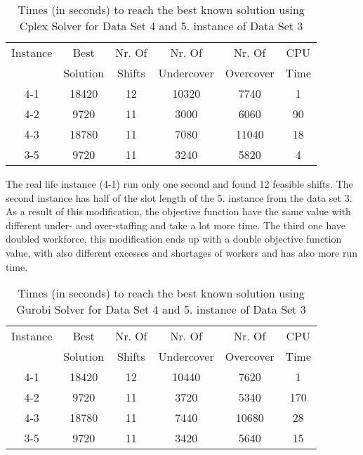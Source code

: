 \begin{table} \small
\centering
\begin{tabular}{cccccc}
\hline
 Instance & Best & Nr. Of & Nr. Of  & Nr. Of   & CPU   \\
 & Solution & Shifts & Undercover & Overcover & Time \\
\hline
4-1 &  18420	& 12 & 10320 & 7740 & 1 \\

4-2 &  9720	& 11 & 3000 & 6060 & 90 \\

4-3 &  18780 & 11 & 7080 & 11040 & 18   \\

3-5 &  9720	& 11 & 3240 & 5820 & 4     \\
\hline
\end{tabular}
\caption{Times (in seconds) to reach the best known solution using Cplex Solver for Data Set 4 and 5. instance of Data Set 3}
\label{tbl:dataset4}
\end{table}


The real life instance (4-1) run only one second and found 12 feasible shifts. The second instance has half of the slot length of the 5. instance from the data set 3. As a result of this modification, the objective function have the same value with different under- and over-staffing and take a lot more time. The third one have doubled workforce, this modification ends up with a double objective function value, with also different excesses and shortages of workers and has also more run time.

\begin{table} \small
\centering
\begin{tabular}{cccccc}
\hline
 Instance & Best & Nr. Of & Nr. Of  & Nr. Of   & CPU   \\
 & Solution & Shifts & Undercover & Overcover & Time \\
\hline
4-1 &  18420	& 12 & 10440 & 7620 & 1 \\

4-2 &  9720	& 11 & 3720 & 5340 & 170 \\

4-3 &  18780 & 11 & 7440 & 10680 & 28   \\

3-5 &  9720	& 11 & 3420 & 5640 & 15     \\
\hline
\end{tabular}
\caption{Times (in seconds) to reach the best known solution using Gurobi Solver for Data Set 4 and 5. instance of Data Set 3}
\label{tbl:dataset4}
\end{table}


